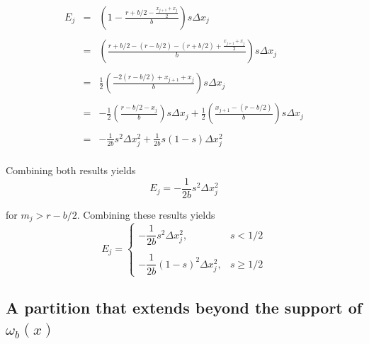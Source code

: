 \documentclass{article}
\begin{document}
\[
\begin{array}{rcl}
    E_j &=& \displaystyle
            \left(
                1
                -
                \frac{
                    r + b/2 -
                    \frac{x_{j+1} + x_j}{2}
                }{b}
            \right) s \Delta x_j \\
        & & \\
        &=& \displaystyle
            \left(
                \frac{
                    r + b/2 - (r - b/2)
                    -
                    (r + b/2)
                    +
                    \frac{x_{j+1} + x_j}{2}
                }{b}
            \right) s \Delta x_j \\
        & & \\
        &=& \displaystyle
        \frac{1}{2}
        \left(
            \frac{
                -2(r - b/2)
                +
                x_{j+1} + x_j
            }{b}
        \right) s \Delta x_j \\
        & & \\
        &=& \displaystyle
        -\frac{1}{2}
        \left(
            \frac{
                r - b/2 - x_j
            }{b}
        \right) s \Delta x_j
        +
        \frac{1}{2}
        \left(
            \frac{
                x_{j+1} - (r - b/2)
            }{b}
        \right) s \Delta x_j \\
        & & \\
        &=& \displaystyle
        -\frac{1}{2b} s^2 \Delta x_j^2
        +
        \frac{1}{2b} s(1 - s) \Delta x_j^2 \\
\end{array}
\]

\noindent
Combining both results yields
\[
    E_j = -\frac{1}{2b} s^2 \Delta x_j^2
\]

\noindent
for $m_j > r - b/2$. Combining these results yields
\[
    E_j =
    \begin{cases}
        -\dfrac{1}{2b} s^2 \Delta x_j^2, & s < 1/2
        \\ \\
        -\dfrac{1}{2b} (1-s)^2 \Delta x_j^2, & s \geq 1/2
    \end{cases}
\]

\newpage

\subsection{A partition that extends beyond the support of $\omega_b(x)$}
\end{document}

